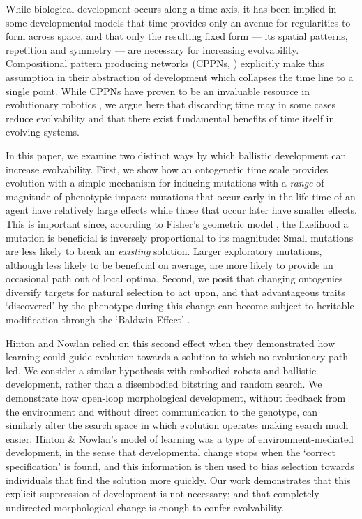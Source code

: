 While biological development occurs along a time axis, it has been implied 
in some developmental models that time provides only an avenue for regularities to form across space, and that only
the resulting fixed form --- its spatial patterns, repetition and symmetry --- are 
necessary for increasing evolvability.
Compositional pattern producing networks (CPPNs,  \cite{Stanley2007}) explicitly make this assumption in their abstraction of development which collapses the time line to a single point.
While CPPNs have proven to be an invaluable resource in evolutionary robotics \cite{Cheney:2013:UEE:2463372.2463404}, we argue here that discarding time 
may in some cases reduce evolvability
and that there exist fundamental benefits of time itself
in evolving systems.


In this paper, we examine two distinct ways by which ballistic development can increase evolvability.
First, we show how an ontogenetic time scale provides evolution with a 
simple mechanism for inducing mutations with a \textit{range} of magnitude
of phenotypic impact: mutations that occur early in the life time
of an agent have relatively large effects while those that occur
later have smaller effects.
This is important since, according to Fisher's geometric model \cite{fisher1930genetical}, the likelihood a mutation is beneficial is inversely proportional to its magnitude:
Small mutations are less likely to break an \textit{existing} solution.
Larger exploratory mutations, although less likely to be beneficial on average, are more likely to provide an occasional path out of local optima.
Second, we posit that changing ontogenies diversify targets for natural selection to act upon, and that advantageous traits `discovered' by the phenotype during this change can become subject to heritable modification through the `Baldwin Effect' \cite{downing2004development}.

Hinton and Nowlan \cite{hinton1987learning} relied on this second effect when they demonstrated how learning could guide evolution towards a solution to which no evolutionary path led. 
We consider a similar hypothesis with embodied robots and ballistic development, rather than a disembodied bitstring and random search. We demonstrate how open-loop morphological development, without feedback from the environment and without direct communication to the genotype, can similarly alter the search space in which evolution operates making search much easier. 
Hinton \& Nowlan's model of learning was a type of environment-mediated development, in the sense that developmental change stops when the `correct specification' is found, and this information is then used to bias selection towards individuals that find the solution more quickly.
Our work demonstrates that this explicit suppression of development is not necessary; and that completely undirected morphological change is enough to confer evolvability.

